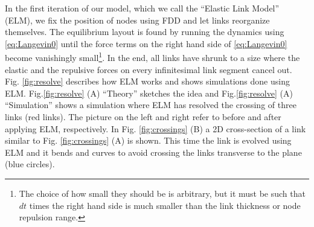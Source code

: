\documentclass[nofootinbib,preprint,endfloats]{revtex4} %
\begin{document}

In the first iteration of our model, which we call the ``Elastic Link Model'' (ELM), we fix the position of nodes using FDD and let links reorganize themselves. 
The equilibrium layout is found by %
running the dynamics using  \eqref{eq:Langevin0} until the force terms on the right hand side of \eqref{eq:Langevin0} become vanishingly small\footnote{The choice of how small they should be is arbitrary, but it must be such that $dt$ times the right hand side is much smaller than the link thickness or node repulsion range.}. 
In the end, all links have shrunk to a size where the elastic and the repulsive forces on every infinitesimal link segment cancel out. 
Fig. \ref{fig:resolve} describes how ELM works and shows  simulations done using ELM. 
Fig.\ref{fig:resolve} (A) ``Theory'' sketches the idea and Fig.\ref{fig:resolve} (A) ``Simulation'' shows a simulation where ELM has resolved the crossing of three links (red links). 
The picture on the left and right refer to before and after applying ELM, respectively. In Fig. \ref{fig:crossings} (B) a 2D cross-section of a link similar to  Fig. \ref{fig:crossings} (A) is shown.
This time the link is evolved using ELM and it bends and curves to avoid crossing the links transverse to the plane (blue circles). 
%
\end{document}
